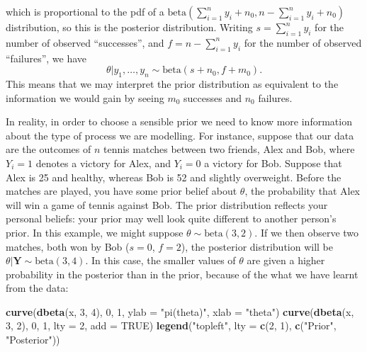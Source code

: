 \documentclass[]{book}
\newenvironment{Shaded}{\begin{snugshade}}{\end{snugshade}}
\newcommand{\KeywordTok}[1]{\textcolor[rgb]{0.13,0.29,0.53}{\textbf{#1}}}
\newcommand{\DataTypeTok}[1]{\textcolor[rgb]{0.13,0.29,0.53}{#1}}
\newcommand{\DecValTok}[1]{\textcolor[rgb]{0.00,0.00,0.81}{#1}}
\newcommand{\StringTok}[1]{\textcolor[rgb]{0.31,0.60,0.02}{#1}}
\newcommand{\OtherTok}[1]{\textcolor[rgb]{0.56,0.35,0.01}{#1}}
\newcommand{\NormalTok}[1]{#1}
\theoremstyle{definition}
\theoremstyle{definition}
\theoremstyle{definition}
\theoremstyle{remark}
\begin{document}
which is proportional to the pdf of a
\(\text{beta}\left(\sum_{i=1}^n y_i + n_0, n - \sum_{i=1}^n y_i + n_0\right)\)
distribution, so this is the posterior distribution. Writing
\(s = \sum_{i=1}^n y_i\) for the number of observed ``successes'', and
\(f = n - \sum_{i=1}^n y_i\) for the number of observed ``failures'', we
have \[\theta|y_1, \ldots, y_n \sim \text{beta}(s + n_0, f + m_0).\]
This means that we may interpret the prior distribution as equivalent to
the information we would gain by seeing \(m_0\) successes and \(n_0\)
failures.

In reality, in order to choose a sensible prior we need to know more
information about the type of process we are modelling. For instance,
suppose that our data are the outcomes of \(n\) tennis matches between
two friends, Alex and Bob, where \(Y_i = 1\) denotes a victory for Alex,
and \(Y_i = 0\) a victory for Bob. Suppose that Alex is 25 and healthy,
whereas Bob is 52 and slightly overweight. Before the matches are
played, you have some prior belief about \(\theta\), the probability
that Alex will win a game of tennis against Bob. The prior distribution
reflects your personal beliefs: your prior may well look quite different
to another person's prior. In this example, we might suppose
\(\theta \sim \text{beta}(3, 2)\). If we then observe two matches, both
won by Bob (\(s = 0\), \(f = 2\)), the posterior distribution will be
\(\theta|\bm Y \sim \text{beta}(3, 4)\). In this case, the smaller
values of \(\theta\) are given a higher probability in the posterior
than in the prior, because of the what we have learnt from the data:

\begin{Shaded}
\begin{Highlighting}[]
\KeywordTok{curve}\NormalTok{(}\KeywordTok{dbeta}\NormalTok{(x, }\DecValTok{3}\NormalTok{, }\DecValTok{4}\NormalTok{), }\DecValTok{0}\NormalTok{, }\DecValTok{1}\NormalTok{, }\DataTypeTok{ylab =} \StringTok{"pi(theta)"}\NormalTok{, }\DataTypeTok{xlab =} \StringTok{"theta"}\NormalTok{)}
\KeywordTok{curve}\NormalTok{(}\KeywordTok{dbeta}\NormalTok{(x, }\DecValTok{3}\NormalTok{, }\DecValTok{2}\NormalTok{), }\DecValTok{0}\NormalTok{, }\DecValTok{1}\NormalTok{, }\DataTypeTok{lty =} \DecValTok{2}\NormalTok{, }\DataTypeTok{add =} \OtherTok{TRUE}\NormalTok{)}
\KeywordTok{legend}\NormalTok{(}\StringTok{"topleft"}\NormalTok{, }\DataTypeTok{lty =} \KeywordTok{c}\NormalTok{(}\DecValTok{2}\NormalTok{, }\DecValTok{1}\NormalTok{), }\KeywordTok{c}\NormalTok{(}\StringTok{"Prior"}\NormalTok{, }\StringTok{"Posterior"}\NormalTok{)) }
\end{Highlighting}
\end{Shaded}
\end{document}
